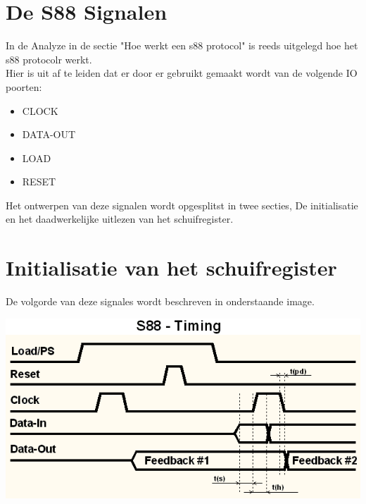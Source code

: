 \section{De S88 Signalen}

In de Analyze in de sectie "Hoe werkt een s88 protocol" is reeds uitgelegd hoe het s88 protocolr werkt. 
\\
Hier is uit af te leiden dat er door er gebruikt gemaakt wordt van de volgende IO poorten:

\begin{itemize}
	\item CLOCK
	\item DATA-OUT
	\item LOAD
	\item RESET
\end{itemize}

Het ontwerpen van deze signalen wordt opgesplitst in twee secties, De initialisatie en het daadwerkelijke uitlezen van het schuifregister.

\section{Initialisatie van het schuifregister}


De volgorde van deze signales wordt beschreven in onderstaande image.

\includegraphics[scale=0.9]{./img/s88timing.png}


